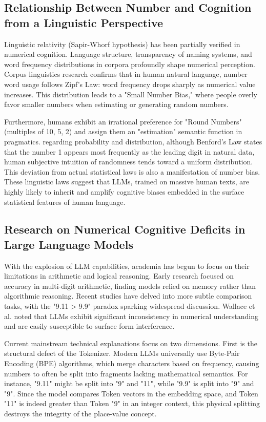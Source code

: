 \subsection{Relationship Between Number and Cognition from a Linguistic Perspective}

Linguistic relativity (Sapir-Whorf hypothesis) has been partially verified in numerical cognition. Language structure, transparency of naming systems, and word frequency distributions in corpora profoundly shape numerical perception. Corpus linguistics research confirms that in human natural language, number word usage follows Zipf's Law: word frequency drops sharply as numerical value increases\cite{jansen2025}. This distribution leads to a "Small Number Bias," where people overly favor smaller numbers when estimating or generating random numbers.

Furthermore, humans exhibit an irrational preference for "Round Numbers" (multiples of 10, 5, 2) and assign them an "estimation" semantic function in pragmatics. regarding probability and distribution, although Benford's Law states that the number 1 appears most frequently as the leading digit in natural data, human subjective intuition of randomness tends toward a uniform distribution. This deviation from actual statistical laws is also a manifestation of number bias. These linguistic laws suggest that LLMs, trained on massive human texts, are highly likely to inherit and amplify cognitive biases embedded in the surface statistical features of human language\cite{wallaceb2025}.

\subsection{Research on Numerical Cognitive Deficits in Large Language Models}

With the explosion of LLM capabilities, academia has begun to focus on their limitations in arithmetic and logical reasoning. Early research focused on accuracy in multi-digit arithmetic, finding models relied on memory rather than algorithmic reasoning. Recent studies have delved into more subtle comparison tasks, with the "9.11 > 9.9" paradox sparking widespread discussion. Wallace et al. noted that LLMs exhibit significant inconsistency in numerical understanding and are easily susceptible to surface form interference\cite{wallace2019}.

Current mainstream technical explanations focus on two dimensions. First is the structural defect of the Tokenizer. Modern LLMs universally use Byte-Pair Encoding (BPE) algorithms, which merge characters based on frequency, causing numbers to often be split into fragments lacking mathematical semantics. For instance, "9.11" might be split into "9" and "11", while "9.9" is split into "9" and "9". Since the model compares Token vectors in the embedding space, and Token "11" is indeed greater than Token "9" in an integer context, this physical splitting destroys the integrity of the place-value concept\cite{singh2024}.

